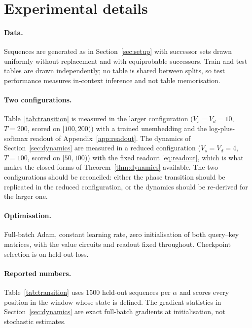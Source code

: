 \section{Experimental details}
\label{app:exp}

\paragraph{Data.}
Sequences are generated as in Section~\ref{sec:setup} with successor sets drawn uniformly without
replacement and with equiprobable successors. Train and test tables are drawn independently; no
table is shared between splits, so test performance measures in-context inference and not table
memorisation.

\paragraph{Two configurations.}
Table~\ref{tab:transition} is measured in the larger configuration
($V_s=V_d=10$, $T=200$, scored on $[100,200)$) with a trained unembedding and the log-plus-softmax
readout of Appendix~\ref{app:readout}. The dynamics of Section~\ref{sec:dynamics} are measured in
a reduced configuration ($V_s=V_d=4$, $T=100$, scored on $[50,100)$) with the fixed readout
\eqref{eq:readout}, which is what makes the closed forms of Theorem~\ref{thm:dynamics} available.
The two configurations should be reconciled: either the phase transition should be replicated in
the reduced configuration, or the dynamics should be re-derived for the larger one.

\paragraph{Optimisation.}
Full-batch Adam, constant learning rate, zero initialisation of both query--key matrices, with the
value circuits and readout fixed throughout. Checkpoint selection is on held-out loss.

\paragraph{Reported numbers.}
Table~\ref{tab:transition} uses 1500 held-out sequences per $\alpha$ and scores every position in
the window whose state is defined. The gradient statistics in Section~\ref{sec:dynamics} are exact
full-batch gradients at initialisation, not stochastic estimates.

